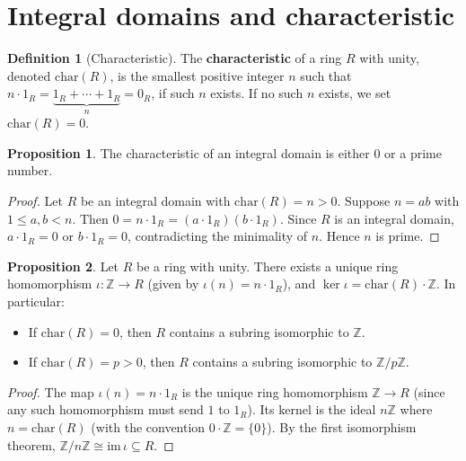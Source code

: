 \documentclass[12pt,a4paper,openany]{book}
\theoremstyle{definition}
\newtheorem{definition}{Definition}[chapter]
\newtheorem{proposition}{Proposition}[chapter]
\theoremstyle{remark}
\begin{document}
\section{Integral domains and characteristic}\label{sec:characteristic}

\begin{definition}[Characteristic]\label{def:characteristic}
The \textbf{characteristic} of a ring $R$ with unity, denoted $\mathrm{char}(R)$, is the smallest positive integer $n$ such that $n\cdot 1_R=\underbrace{1_R+\cdots+1_R}_{n}=0_R$, if such $n$ exists. If no such $n$ exists, we set $\mathrm{char}(R)=0$.
\end{definition}

\begin{proposition}\label{prop:char-domain}
The characteristic of an integral domain is either $0$ or a prime number.
\end{proposition}

\begin{proof}
Let $R$ be an integral domain with $\mathrm{char}(R)=n>0$. Suppose $n=ab$ with $1\leq a,b<n$. Then $0=n\cdot 1_R=(a\cdot 1_R)(b\cdot 1_R)$. Since $R$ is an integral domain, $a\cdot 1_R=0$ or $b\cdot 1_R=0$, contradicting the minimality of $n$. Hence $n$ is prime.
\end{proof}

\begin{proposition}\label{prop:char-homomorphism}
Let $R$ be a ring with unity. There exists a unique ring homomorphism $\iota\colon\mathbb{Z}\to R$ (given by $\iota(n)=n\cdot 1_R$), and $\ker\iota=\mathrm{char}(R)\cdot\mathbb{Z}$. In particular:
\begin{itemize}
    \item If $\mathrm{char}(R)=0$, then $R$ contains a subring isomorphic to $\mathbb{Z}$.
    \item If $\mathrm{char}(R)=p>0$, then $R$ contains a subring isomorphic to $\mathbb{Z}/p\mathbb{Z}$.
\end{itemize}
\end{proposition}

\begin{proof}
The map $\iota(n)=n\cdot 1_R$ is the unique ring homomorphism $\mathbb{Z}\to R$ (since any such homomorphism must send $1$ to $1_R$). Its kernel is the ideal $n\mathbb{Z}$ where $n=\mathrm{char}(R)$ (with the convention $0\cdot\mathbb{Z}=\{0\}$). By the first isomorphism theorem, $\mathbb{Z}/n\mathbb{Z}\cong\mathrm{im}\,\iota\subseteq R$.
\end{proof}
\end{document}
